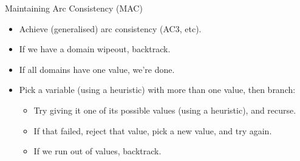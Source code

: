 \documentclass{beamer}
\begin{document}
\begin{frame}{Maintaining Arc Consistency (MAC)}
     {
        \begin{itemize}
            \item Achieve (generalised) arc consistency (AC3, etc).
            \item If we have a domain wipeout, backtrack.
            \item If all domains have one value, we're done.
            \item Pick a variable (using a heuristic) with more than one value, then branch:
                \begin{itemize}
                    \item Try giving it one of its possible values (using a heuristic), and recurse.
                    \item If that failed, reject that value, pick a new value, and try again.
                    \item If we run out of values, backtrack.
                \end{itemize}
        \end{itemize}
    }

     {
        
    }

     {
        
    }

     {
        
    }

     {
        
    }
\end{frame}
\end{document}
